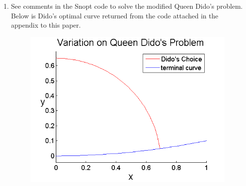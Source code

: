 \documentclass[10pt]{article}
\newcommand{\bbr}{\mathbb{R}}
\begin{document}
\begin{enumerate}[leftmargin=*]
        (c): Substituting the constraint into the objective function gives the unconstrained problem
               \begin{equation}
                \begin{aligned}
                & \underset{y\in\bbr}{\text{minimize}}
                & & y^2+y+4 \\
                \end{aligned}
              \end{equation}
         Therefore a necessary condition is that the gradient of the objective function must be zero, giving us $2y+1=0$, so all optimal points of this new optimization problem must have that the y-component is $-\frac{1}{2}$, which is clearly different from the results derived in (a). Hence we see that by substituting the constraint into the objective function, we ended up with a different problem; that is, we received a different necessary condition.

  \item See comments in the Snopt code to solve the modified Queen Dido's problem.  Below is Dido's optimal curve returned from the code attached in the appendix to this paper.
      
                \begin{figure}[H]
                        \centering
                        \includegraphics[width=.5\textwidth]{optimalCurve.png}
                        \captionsetup{width=0.8\textwidth}
                      \end{figure}
\end{enumerate}


\newpage
\end{document}
